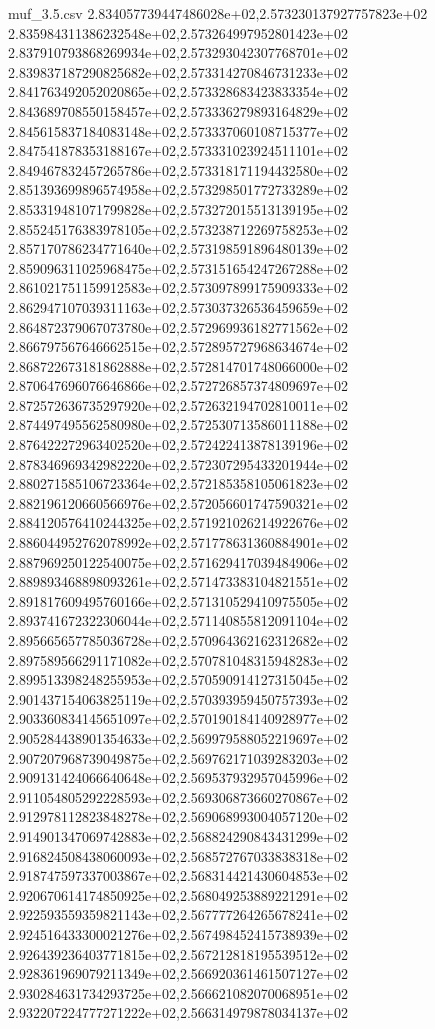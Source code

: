 \begin{filecontents*}{muf_3.5.csv}
2.834057739447486028e+02,2.573230137927757823e+02
2.835984311386232548e+02,2.573264997952801423e+02
2.837910793868269934e+02,2.573293042307768701e+02
2.839837187290825682e+02,2.573314270846731233e+02
2.841763492052020865e+02,2.573328683423833354e+02
2.843689708550158457e+02,2.573336279893164829e+02
2.845615837184083148e+02,2.573337060108715377e+02
2.847541878353188167e+02,2.573331023924511101e+02
2.849467832457265786e+02,2.573318171194432580e+02
2.851393699896574958e+02,2.573298501772733289e+02
2.853319481071799828e+02,2.573272015513139195e+02
2.855245176383978105e+02,2.573238712269758253e+02
2.857170786234771640e+02,2.573198591896480139e+02
2.859096311025968475e+02,2.573151654247267288e+02
2.861021751159912583e+02,2.573097899175909333e+02
2.862947107039311163e+02,2.573037326536459659e+02
2.864872379067073780e+02,2.572969936182771562e+02
2.866797567646662515e+02,2.572895727968634674e+02
2.868722673181862888e+02,2.572814701748066000e+02
2.870647696076646866e+02,2.572726857374809697e+02
2.872572636735297920e+02,2.572632194702810011e+02
2.874497495562580980e+02,2.572530713586011188e+02
2.876422272963402520e+02,2.572422413878139196e+02
2.878346969342982220e+02,2.572307295433201944e+02
2.880271585106723364e+02,2.572185358105061823e+02
2.882196120660566976e+02,2.572056601747590321e+02
2.884120576410244325e+02,2.571921026214922676e+02
2.886044952762078992e+02,2.571778631360884901e+02
2.887969250122540075e+02,2.571629417039484906e+02
2.889893468898093261e+02,2.571473383104821551e+02
2.891817609495760166e+02,2.571310529410975505e+02
2.893741672322306044e+02,2.571140855812091104e+02
2.895665657785036728e+02,2.570964362162312682e+02
2.897589566291171082e+02,2.570781048315948283e+02
2.899513398248255953e+02,2.570590914127315045e+02
2.901437154063825119e+02,2.570393959450757393e+02
2.903360834145651097e+02,2.570190184140928977e+02
2.905284438901354633e+02,2.569979588052219697e+02
2.907207968739049875e+02,2.569762171039283203e+02
2.909131424066640648e+02,2.569537932957045996e+02
2.911054805292228593e+02,2.569306873660270867e+02
2.912978112823848278e+02,2.569068993004057120e+02
2.914901347069742883e+02,2.568824290843431299e+02
2.916824508438060093e+02,2.568572767033838318e+02
2.918747597337003867e+02,2.568314421430604853e+02
2.920670614174850925e+02,2.568049253889221291e+02
2.922593559359821143e+02,2.567777264265678241e+02
2.924516433300021276e+02,2.567498452415738939e+02
2.926439236403771815e+02,2.567212818195539512e+02
2.928361969079211349e+02,2.566920361461507127e+02
2.930284631734293725e+02,2.566621082070068951e+02
2.932207224777271222e+02,2.566314979878034137e+02

\end{filecontents*}
